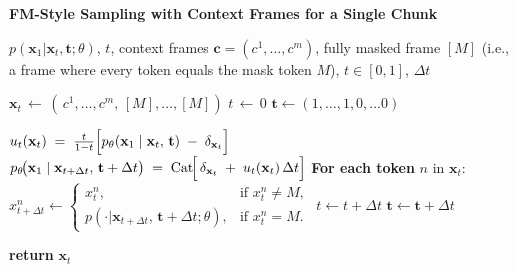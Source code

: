 \begin{algorithm}[!ht]
\caption{\textbf{FM-Style Sampling with Context Frames for a Single Chunk}}
\label{alg:fmsampling}
\begin{algorithmic}[1]
\REQUIRE 
   $p(\mathbf{x}_1 | \mathbf{x}_t, \mathbf{t};\theta)$, 
   $t$, 
   context frames $\mathbf{c} = (c^1,\dots,c^m)$, 
   fully masked frame \([M]\) (i.e., a frame where every token equals the mask token \(M\)),
   $t \in [0,1]$, 
   $\Delta t$

\STATE $\mathbf{x}_t \,\gets\, (\,c^1,\dots,c^m,\,[M],\dots,[M])$
\STATE $t \,\gets\, 0$
\STATE $\mathbf{t} \gets (1,\dots,1,0,\dots0)$

    \STATE $u_t(\mathbf{x}_t) 
        \;=\; 
        \frac{t}{1-t}
        \Bigl[
          p_\theta(\mathbf{x}_1 \mid \mathbf{x}_t,\,\mathbf{t}) 
          \;-\; 
          \delta_{\mathbf{x}_t}
        \Bigr]$
    \STATE $p_\theta\!\bigl(\mathbf{x}_1 \mid \mathbf{x}_{t+\Delta t},\,\mathbf{t}+\Delta t\bigr)
        \;=\;
        \mathrm{Cat}\!\Bigl[\,
          \delta_{\mathbf{x}_t}
          \;+\; 
          u_t(\mathbf{x}_t)\,\Delta t
        \Bigr]$
    \STATE \textbf{For each token} $n$ in $\mathbf{x}_t$: 
    \STATE \quad 
    $
       x_{t+\Delta t}^{n} \gets
       \begin{cases}
          x_t^{n}, & \text{if } x_t^{n} \neq M,\\
          p(\cdot | \mathbf{x}_{t+\Delta t},\,\mathbf{t}+\Delta t; \theta), & \text{if } x_t^{n} = M.
       \end{cases}
    $
\STATE $t \gets t + \Delta t$
\STATE $\mathbf{t} \gets \mathbf{t} + \Delta t$

\ENDWHILE
\STATE \textbf{return} $\mathbf{x}_t$
\end{algorithmic}
\end{algorithm}

